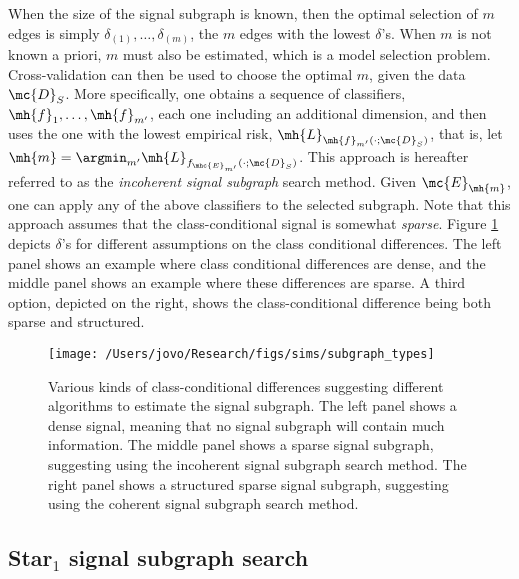 When the size of the signal subgraph is known, then the optimal selection of $m$ edges is simply $\delta_{(1)},\ldots, \delta_{(m)}$, the $m$ edges with the lowest $\delta$'s.  When $m$ is not known a priori, $m$ must also be estimated, which is a model selection problem.   Cross-validation can then be used to choose the optimal $m$, given the data $\mc{D}_S$.  More specifically, one obtains a sequence of classifiers, $\mh{f}_1, \ldots, \mh{f}_{m'}$, each one including an additional dimension, and then uses the one with the lowest empirical risk, $\mh{L}_{\mh{f}_{m'}(\cdot; \mc{D}_S)}$, that is, let $\mh{m}=\argmin_{m'} \mh{L}_{f_{\mhc{E}_{m'}}(\cdot; \mc{D}_S)}$.  This approach is hereafter referred to as the \emph{incoherent signal subgraph} search method.  Given $\mc{E}_{\mh{m}}$, one can apply any of the above classifiers to the selected subgraph.  Note that this approach assumes that the class-conditional signal is somewhat \emph{sparse}.  Figure \ref{fig:subgraph_types} depicts $\delta$'s for different assumptions on the class conditional differences.  The left panel shows an example where class conditional differences are dense, and the middle panel shows an example where these differences are sparse.  A third option, depicted on the right, shows the class-conditional difference being both sparse and structured.



\begin{figure}[h!]
\centering \texttt{[image: /Users/jovo/Research/figs/sims/subgraph\_types]}
\caption{Various kinds of class-conditional differences suggesting different algorithms to estimate the signal subgraph.  The left panel shows a dense signal, meaning that no signal subgraph will contain much information.  The middle panel shows a sparse signal subgraph, suggesting using the incoherent signal subgraph search method.  The right panel shows a structured sparse signal subgraph, suggesting using the coherent signal subgraph search method.}
\label{fig:subgraph_types}
\end{figure}



\subsection{Star$_1$ signal subgraph search} %
\label{sub:utilizing_graph_structure}

